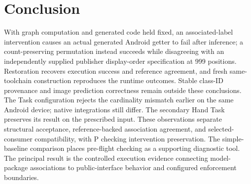 \documentclass[10pt,twocolumn,letterpaper]{article}
\begin{document}
\section{Conclusion}
With graph computation and generated code held fixed, an associated-label intervention causes an actual generated Android getter to fail after inference; a count-preserving permutation instead succeeds while disagreeing with an independently supplied publisher display-order specification at 999 positions. Restoration recovers execution success and reference agreement, and fresh same-toolchain construction reproduces the runtime outcomes. Stable class-ID provenance and image prediction correctness remain outside these conclusions. The Task configuration rejects the cardinality mismatch earlier on the same Android device; native integrations still differ. The secondary Hand Task preserves its result on the prescribed input. These observations separate structural acceptance, reference-backed association agreement, and selected-consumer compatibility, with P checking intervention preservation. The simple-baseline comparison places pre-flight checking as a supporting diagnostic tool. The principal result is the controlled execution evidence connecting model-package associations to public-interface behavior and configured enforcement boundaries.
\end{document}
